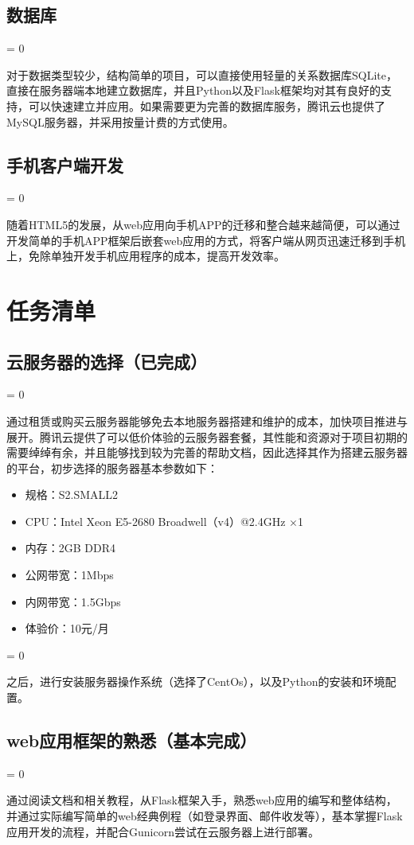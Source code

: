 \documentclass[a4paper,11pt]{ctexart}
\newcommand{\subpar}
{
	\par
	\hangafter = 0
	\setlength{\hangindent}{1em}
}
\begin{document}
\begin{spacing}{1.5}
\subsection{数据库}
\subpar
对于数据类型较少，结构简单的项目，可以直接使用轻量的关系数据库SQLite，直接在服务器端本地建立数据库，并且Python以及Flask框架均对其有良好的支持，可以快速建立并应用。如果需要更为完善的数据库服务，腾讯云也提供了MySQL服务器，并采用按量计费的方式使用。


\subsection{手机客户端开发}
\subpar
随着HTML5的发展，从web应用向手机APP的迁移和整合越来越简便，可以通过开发简单的手机APP框架后嵌套web应用的方式，将客户端从网页迅速迁移到手机上，免除单独开发手机应用程序的成本，提高开发效率。


\section{任务清单}
\subsection{云服务器的选择（已完成）}
\subpar
通过租赁或购买云服务器能够免去本地服务器搭建和维护的成本，加快项目推进与展开。腾讯云提供了可以低价体验的云服务器套餐，其性能和资源对于项目初期的需要绰绰有余，并且能够找到较为完善的帮助文档，因此选择其作为搭建云服务器的平台，初步选择的服务器基本参数如下：
\begin{itemize}[leftmargin = 3em, topsep=0pt]
	\setlength{\itemsep}{-0.25\baselineskip}
	\item 规格：S2.SMALL2
	\item CPU：Intel Xeon E5-2680 Broadwell（v4）@2.4GHz $\times$1
	\item 内存：2GB DDR4
	\item 公网带宽：1Mbps
	\item 内网带宽：1.5Gbps
	\item 体验价：10元/月
\end{itemize}
\subpar
之后，进行安装服务器操作系统（选择了CentOs），以及Python的安装和环境配置。

\subsection{web应用框架的熟悉（基本完成）}
\subpar
通过阅读文档和相关教程，从Flask框架入手，熟悉web应用的编写和整体结构，并通过实际编写简单的web经典例程（如登录界面、邮件收发等），基本掌握Flask应用开发的流程，并配合Gunicorn尝试在云服务器上进行部署。


\end{spacing}
\end{document}
